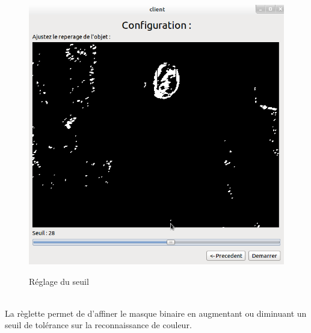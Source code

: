 \documentclass{report}
\begin{document}
				\begin{figure}[!h]
						\centering
						\includegraphics[scale=0.38]{../images/Capture2.png}\\
						\caption{Réglage du seuil}
						\label{Réglage du seuil}
				\end{figure}\\
				La règlette permet de d'affiner le masque binaire en augmentant ou diminuant un seuil de tolérance sur la reconnaissance de couleur. \\
				
\end{document}
